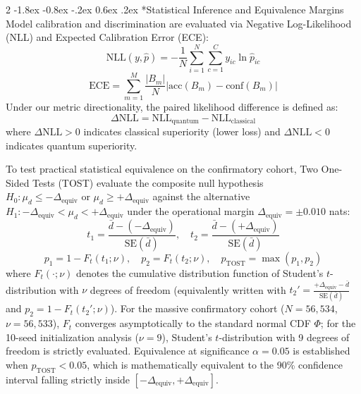 \documentclass[10pt,a4paper,twoside]{article}
\makeatletter
\renewcommand{\subsection}{\@startsection{subsection}{2}{\z@}%
  {-1.8ex \@plus -0.8ex \@minus -.2ex}%
  {0.6ex \@plus.2ex}%
  {\normalfont\normalsize\sffamily\bfseries\color{naturedark}}}
\makeatother
\begin{document}
\begin{multicols}{2}
\subsection*{Statistical Inference and Equivalence Margins}
Model calibration and discrimination are evaluated via Negative Log-Likelihood (NLL) and Expected Calibration Error (ECE):
\begin{equation}
\text{NLL}(y, \hat{p}) = -\frac{1}{N} \sum_{i=1}^N \sum_{c=1}^C y_{ic} \ln \hat{p}_{ic}
\end{equation}
\begin{equation}
\text{ECE} = \sum_{m=1}^M \frac{|B_m|}{N} |\text{acc}(B_m) - \text{conf}(B_m)|
\end{equation}
Under our metric directionality, the paired likelihood difference is defined as:
\begin{equation}
\Delta\text{NLL} = \text{NLL}_{\text{quantum}} - \text{NLL}_{\text{classical}}
\end{equation}
where $\Delta\text{NLL} > 0$ indicates classical superiority (lower loss) and $\Delta\text{NLL} < 0$ indicates quantum superiority.

To test practical statistical equivalence on the confirmatory cohort, Two One-Sided Tests (TOST) \cite{schuirmann1987,lakens2017} evaluate the composite null hypothesis $H_0: \mu_d \le -\Delta_{\text{equiv}} \text{ or } \mu_d \ge +\Delta_{\text{equiv}}$ against the alternative $H_1: -\Delta_{\text{equiv}} < \mu_d < +\Delta_{\text{equiv}}$ under the operational margin $\Delta_{\text{equiv}} = \pm 0.010$ nats:
\begin{equation}
t_1 = \frac{\bar{d} - (-\Delta_{\text{equiv}})}{\text{SE}(\bar{d})}, \quad t_2 = \frac{\bar{d} - (+\Delta_{\text{equiv}})}{\text{SE}(\bar{d})}
\end{equation}
\begin{equation}
p_1 = 1 - F_t(t_1; \nu), \quad p_2 = F_t(t_2; \nu), \quad p_{\text{TOST}} = \max(p_1, p_2)
\end{equation}
where $F_t(\cdot; \nu)$ denotes the cumulative distribution function of Student's $t$-distribution with $\nu$ degrees of freedom (equivalently written with $t_2' = \frac{+\Delta_{\text{equiv}} - \bar{d}}{\text{SE}(\bar{d})}$ and $p_2 = 1 - F_t(t_2'; \nu)$). For the massive confirmatory cohort ($N = 56,534$, $\nu = 56,533$), $F_t$ converges asymptotically to the standard normal CDF $\Phi$; for the 10-seed initialization analysis ($\nu = 9$), Student's $t$-distribution with 9 degrees of freedom is strictly evaluated. Equivalence at significance $\alpha = 0.05$ is established when $p_{\text{TOST}} < 0.05$, which is mathematically equivalent to the 90\% confidence interval falling strictly inside $[-\Delta_{\text{equiv}}, +\Delta_{\text{equiv}}]$.


\end{multicols}
\end{document}
